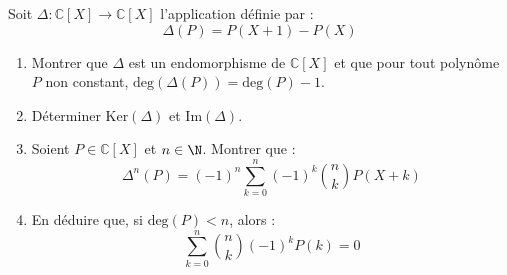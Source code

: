 \documentclass[a4paper,10pt]{report}
\begin{document}
\begin{Exercice}{} Soit $\Delta : \mathbb{C}[X] \rightarrow \mathbb{C}[X]$ l'application définie par :
  \[
  \Delta (P ) = P( X + 1 ) - P(X )
  \]
  \begin{enumerate}
  \item
    Montrer que $\Delta$ est un endomorphisme de $\mathbb{C}[X]$ et que pour tout polynôme $P$ non constant, $\textrm{deg} ( \Delta(P)) = \textrm{deg}(P) - 1$.
  \item
    Déterminer $\textrm{Ker}(\Delta)$ et $\textrm{Im}(\Delta)$.
  \item Soient $P \in \mathbb{C}[X]$ et $n \in \N$. Montrer que :
    \[
    \Delta^{n}(P) = ( - 1)^{n} \sum_{k = 0}^{n} ( - 1)^{k} \binom{n}{k}P(X + k)
    \]
  \item En déduire que, si $\textrm{deg}(P) < n$, alors :
    \[
    \sum_{k = 0}^{n} \binom{n}{k}( - 1)^{k} P(k) = 0 
    \]
  \end{enumerate}
\end{Exercice} 

\corr 
\end{document}
